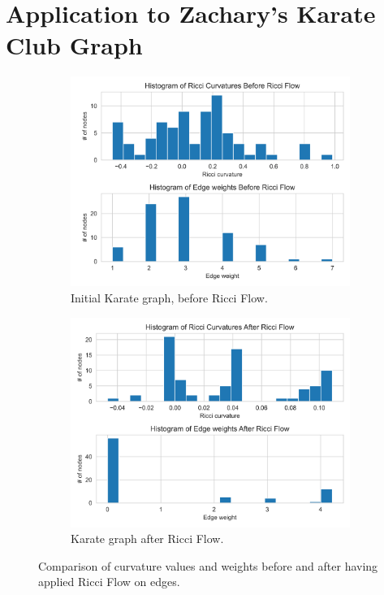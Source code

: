 \section{Application to Zachary's Karate Club Graph}
\label{sec5.3}

\begin{figure}
    \centering
    \begin{subfigure}{0.45\textwidth}
        \centering
        \includegraphics[width=\textwidth]{../KarateClubResults/Before Ricci Flow.png}
        \caption{Initial Karate graph, before Ricci Flow.}
        \label{fig:Karate_Before_Ricci_flow_histo}
    \end{subfigure}
    \hfill
    \begin{subfigure}{0.45\textwidth}
        \centering
        \includegraphics[width=\textwidth]{../KarateClubResults/After Ricci Flow.png}
        \caption{Karate graph after Ricci Flow.}
        \label{fig:Karate_After_Ricci_flow_histo}
    \end{subfigure}
    \caption{Comparison of curvature values and weights before and after having applied Ricci Flow on edges.}
    \label{fig:Karate_comparison_histo}
\end{figure}

